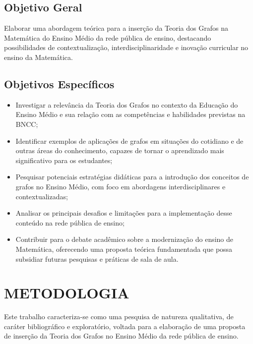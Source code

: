 \documentclass[
  12pt,
  oneside,
  a4paper,
  english,
  brazilian
  ]{abntex2}
\theoremstyle{definition}
\begin{document}
\section{Objetivo Geral}

Elaborar uma abordagem teórica para a inserção da Teoria dos Grafos na Matemática
do Ensino Médio da rede pública de ensino, destacando possibilidades de
contextualização, interdisciplinaridade e inovação curricular no ensino da
Matemática.

\section{Objetivos Específicos}

\begin{itemize}
  \item Investigar a relevância da Teoria dos Grafos no contexto da Educação do
        Ensino Médio e sua relação com as competências e habilidades previstas na
        BNCC;
  \item Identificar exemplos de aplicações de grafos em situações do cotidiano e
        de outras áreas do conhecimento, capazes de tornar o aprendizado mais
        significativo para os estudantes;
  \item Pesquisar potenciais estratégias didáticas para a introdução dos conceitos
        de grafos no Ensino Médio, com foco em abordagens interdisciplinares e
        contextualizadas;
  \item Analisar os principais desafios e limitações para a implementação desse
        conteúdo na rede pública de ensino;
  \item Contribuir para o debate acadêmico sobre a modernização do ensino de
        Matemática, oferecendo uma proposta teórica fundamentada que possa
        subsidiar futuras pesquisas e práticas de sala de aula.
\end{itemize}

\chapter{METODOLOGIA}

Este trabalho caracteriza-se como uma pesquisa de natureza qualitativa, de
caráter bibliográfico e exploratório, voltada para a elaboração de uma proposta
de inserção da Teoria dos Grafos no Ensino Médio da rede pública de ensino.
\end{document}
